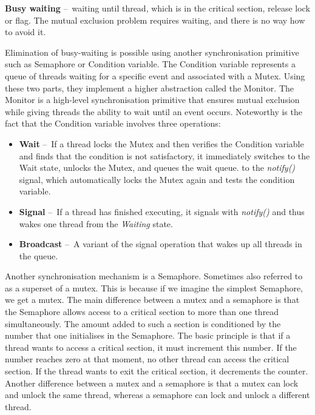 \begin{definition}
  \textbf{Busy waiting} \---\ waiting until thread, which is in the critical section, release lock or flag. The mutual exclusion problem requires waiting, and there is no way how to avoid it.
\end{definition}
Elimination of busy-waiting is possible using another synchronisation primitive such as Semaphore or Condition variable. The Condition variable represents a queue of threads waiting for a specific event and associated with a Mutex. Using these two parts, they implement a higher abstraction called the Monitor. The Monitor is a high-level synchronisation primitive that ensures mutual exclusion while giving threads the ability to wait until an event occurs. Noteworthy is the fact that the Condition variable involves three operations:
\begin{itemize}[itemsep=1mm, parsep=0pt]
\item \textbf {Wait} \---\ If a thread locks the Mutex and then verifies the Condition variable and finds that the condition is not satisfactory, it immediately switches to the Wait state, unlocks the Mutex, and queues the wait queue. to the \emph{notify()} signal, which automatically locks the Mutex again and tests the condition variable.
\item \textbf{Signal} \---\ If a thread has finished executing, it signals with \emph{notify()} and thus wakes one thread from the \emph{Waiting} state.
\item \textbf{Broadcast} \---\ A variant of the signal operation that wakes up all threads in the queue.
\end{itemize}
Another synchronisation mechanism is a Semaphore. Sometimes also referred to as a superset of a mutex. This is because if we imagine the simplest Semaphore, we get a mutex. The main difference between a mutex and a semaphore is that the Semaphore allows access to a critical section to more than one thread simultaneously. The amount added to such a section is conditioned by the number that one initialises in the Semaphore. The basic principle is that if a thread wants to access a critical section, it must increment this number. If the number reaches zero at that moment, no other thread can access the critical section. If the thread wants to exit the critical section, it decrements the counter. Another difference between a mutex and a semaphore is that a mutex can lock and unlock the same thread, whereas a semaphore can lock and unlock a different thread.


